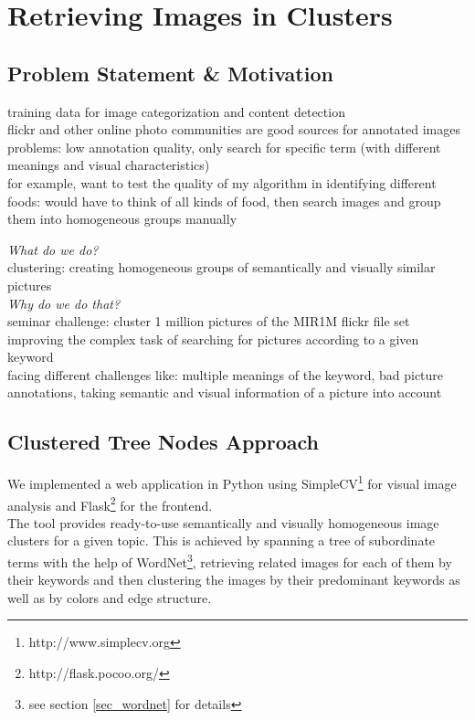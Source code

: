 \section{Retrieving Images in Clusters}
\label{sec_introduction}


\subsection{Problem Statement \& Motivation}
training data for image categorization and content detection \\
flickr and other online photo communities are good sources for annotated images \\
problems: low annotation quality, only search for specific term (with different meanings and visual characteristics) \\
for example, want to test the quality of my algorithm in identifying different foods: would have to think of all kinds of food, then search images and group them into homogeneous groups manually

\bigskip

\emph{What do we do?} \\
clustering: creating homogeneous groups of semantically and visually similar pictures \\

\emph{Why do we do that?} \\
seminar challenge: cluster 1 million pictures of the MIR1M flickr file   set \\
improving the complex task of searching for pictures according to a given keyword \\
facing different challenges like: multiple meanings of the keyword, bad picture annotations, taking semantic and visual information of a picture into account \\

\subsection{Clustered Tree Nodes Approach}
We implemented a web application in Python using SimpleCV\footnote{http://www.simplecv.org} for visual image analysis and Flask\footnote{http://flask.pocoo.org/} for the frontend.\\
The tool provides ready-to-use semantically and visually homogeneous image clusters for a given topic. This is achieved by spanning a tree of subordinate terms with the help of WordNet\footnote{see section \ref{sec_wordnet} for details}, retrieving related images for each of them by their keywords  and then clustering the images by their predominant keywords as well as by colors and edge structure.


